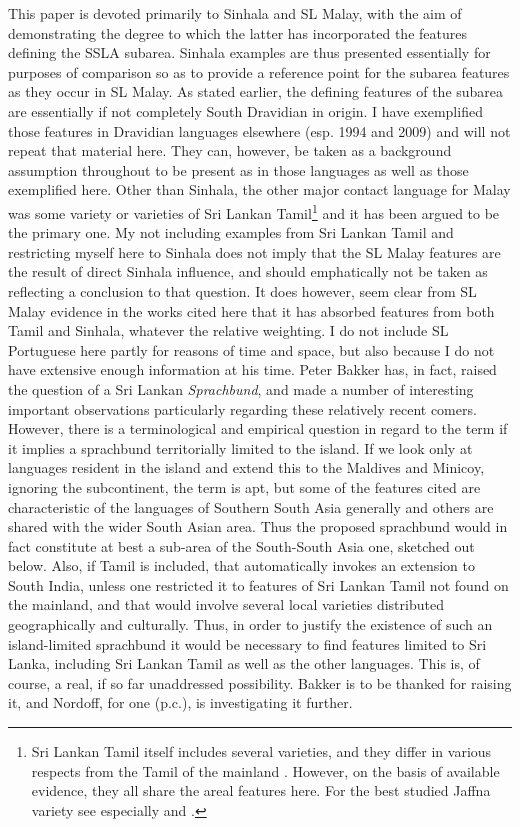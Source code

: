 This paper is devoted primarily to Sinhala and SL Malay, with the aim of demonstrating the degree to which the latter has incorporated the features defining the SSLA subarea. Sinhala examples are thus presented essentially for purposes of comparison so as to provide a reference point for the subarea features as they occur in SL Malay. As stated earlier, the defining features of the subarea are essentially if not completely South Dravidian in origin. I have exemplified those features in Dravidian  languages elsewhere (esp. 1994 and 2009) \nocite{Gair1994,Gair2009} and will not repeat that material here. They can, however, be taken as a background assumption throughout to be present as in those languages as well as those exemplified here. Other than Sinhala, the other major contact language for Malay was some variety or varieties of Sri Lankan Tamil\footnote{Sri
  Lankan Tamil itself includes several varieties, and they differ in various respects from the Tamil of the mainland \citep{Suseendirarajah2008}. However, on the basis of available evidence, they all share the areal features here. For the best studied Jaffna variety see especially \citet{GairEtAl1978} and \citet{Suseendirarajah1993}.
} 
and it has been argued to be the primary one. My not including examples from Sri Lankan Tamil and restricting myself here to Sinhala does not imply that the SL Malay features are the result of direct Sinhala influence, and should emphatically not be taken as reflecting a conclusion to that question. It does however, seem clear from SL Malay evidence in the works cited here that it has absorbed features from both Tamil and Sinhala, whatever the relative weighting. I do not include SL Portuguese here partly for reasons of time and space, but also because I do not have extensive enough information at his time.
Peter Bakker \nocite{Bakker2006} has, in fact, raised the question of a Sri Lankan \textit{Sprachbund}, and made a number of interesting important observations particularly regarding these relatively recent comers. However, there is a terminological and empirical question in regard to the term if it implies a sprachbund territorially limited to the island. If we look only at languages resident in the island and extend this to the Maldives and Minicoy, ignoring the subcontinent, the term is apt, but some of the features cited are characteristic of the languages of Southern South Asia generally and others are shared with the wider South Asian area. Thus the proposed sprachbund would in fact constitute at best a sub-area of the South-South Asia one, sketched out below. Also, if Tamil is included, that automatically invokes an extension to South India, unless one restricted it to features of Sri Lankan Tamil not found on the mainland, and that would involve several local varieties distributed geographically and culturally. Thus, in order to justify the existence of such an island-limited sprachbund it would be necessary to find features limited to Sri Lanka, including Sri Lankan Tamil as well as the other languages. This is, of course, a real, if so far unaddressed possibility. Bakker is to be thanked for raising it, and Nordoff, for one (p.c.), is investigating it further. 

